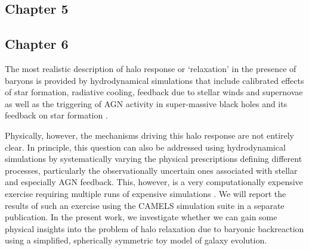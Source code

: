 \documentclass[a4paper, 12pt, oneside]{Thesis}  %
\begin{document}
\subsection*{Chapter 5}



\subsection*{Chapter 6}

The most realistic description of halo response or `relaxation' in the presence of baryons is provided by hydrodynamical simulations that include calibrated effects of star formation, radiative cooling, feedback due to stellar winds and supernovae as well as the triggering of AGN activity in super-massive black holes and its feedback on star formation \cite{2015Schaye_EAGLE,2018TNG_Pillepich_etal}. 


Physically, however, the mechanisms driving this halo response are not entirely clear. In principle, this question can also be addressed using hydrodynamical simulations by systematically varying the physical prescriptions defining different processes, particularly the observationally uncertain ones associated with stellar and especially AGN feedback. This, however, is a very computationally expensive exercise requiring multiple runs of expensive simulations \cite{2015Schaye_EAGLE,2021camels_presentation}.
We will report the results of such an exercise using the CAMELS simulation suite \cite{2022camels_data_release1} in a separate publication. In the present work, we investigate whether we can gain some physical insights into the problem of halo relaxation due to baryonic backreaction using a simplified, spherically symmetric toy model of galaxy evolution.
\end{document}
